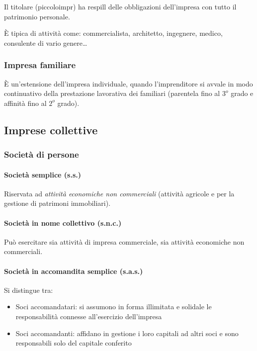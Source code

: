 Il titolare (\gls{piccoloimpr}) ha \gls{respill} delle obbligazioni dell'impresa con tutto il patrimonio personale.

È tipica di attività come: commercialista, architetto, ingegnere, medico,
consulente di vario genere\dots

\subsubsection{Impresa familiare}
È un'estensione dell’impresa individuale, quando l’imprenditore
si avvale in modo continuativo della prestazione lavorativa dei familiari
(parentela fino al $3^o$ grado e affinità fino al $2^o$ grado).



\subsection{Imprese collettive}

\subsubsection{Società di persone}

\paragraph{Società semplice (s.s.)} Riservata ad \emph{attività economiche non commerciali}
(attività agricole e per la gestione di patrimoni immobiliari).

\paragraph{Società in nome collettivo (s.n.c.)} Può esercitare sia attività di
impresa commerciale, sia attività economiche non commerciali.

\paragraph{Società in accomandita semplice (s.a.s.)} Si distingue tra:
\begin{itemize}
    \item Soci accomandatari: si assumono in forma illimitata e solidale le
    responsabilità connesse all'esercizio dell'impresa
    \item Soci accomandanti: affidano in gestione i loro capitali ad altri soci e
    sono responsabili solo del capitale conferito
\end{itemize}

